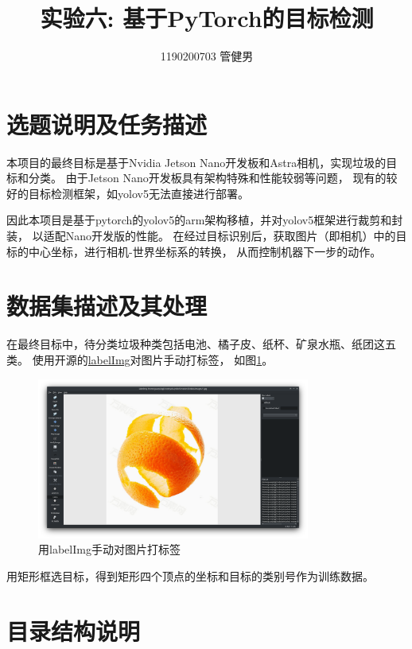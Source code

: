\documentclass{article}
\title{实验六: 基于PyTorch的目标检测}
\author{1190200703 管健男}
\date{}
\begin{document}
\maketitle


\section{选题说明及任务描述}

本项目的最终目标是基于Nvidia Jetson Nano开发板和Astra相机，实现垃圾的目标和分类。
由于Jetson Nano开发板具有架构特殊和性能较弱等问题，
现有的较好的目标检测框架，如yolov5无法直接进行部署。

因此本项目是基于pytorch的yolov5的arm架构移植，并对yolov5框架进行裁剪和封装，
以适配Nano开发版的性能。
在经过目标识别后，获取图片（即相机）中的目标的中心坐标，进行相机-世界坐标系的转换，
从而控制机器下一步的动作。


\section{数据集描述及其处理}

在最终目标中，待分类垃圾种类包括电池、橘子皮、纸杯、矿泉水瓶、纸团这五类。
使用开源的\href{https://github.com/tzutalin/labelImg}{labelImg}对图片手动打标签，
如图\ref{labelImg}。

\begin{figure}[H]
    \centering
    \includegraphics[width=0.8\textwidth]{figures/labelImg-window.png}
    \caption{用labelImg手动对图片打标签}
    \label{labelImg}
\end{figure}

用矩形框选目标，得到矩形四个顶点的坐标和目标的类别号作为训练数据。


\section{目录结构说明}
\end{document}
